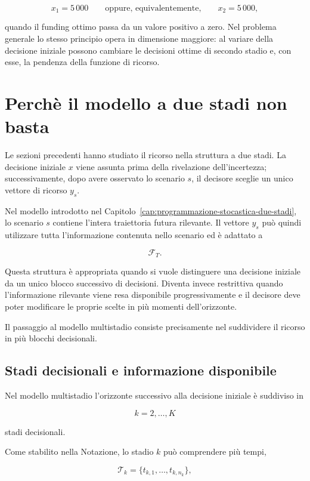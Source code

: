 \[
x_1=5\,000
\qquad\text{oppure, equivalentemente,}\qquad
x_2=5\,000,
\]

quando il funding ottimo passa da un valore positivo a zero. Nel problema
generale lo stesso principio opera in dimensione maggiore: al variare della
decisione iniziale possono cambiare le decisioni ottime di secondo stadio e,
con esse, la pendenza della funzione di ricorso.

\section{Perch\`e il modello a due stadi non basta}

\label{sec:cap15-motivazione-multistadio-v2}

Le sezioni precedenti hanno studiato il ricorso nella struttura a due stadi.
La decisione iniziale $x$ viene assunta prima della rivelazione
dell'incertezza; successivamente, dopo avere osservato lo scenario $s$, il
decisore sceglie un unico vettore di ricorso $y_s$.

Nel modello introdotto nel Capitolo~\ref{cap:programmazione-stocastica-due-stadi},
lo scenario $s$ contiene l'intera traiettoria futura rilevante. Il vettore
$y_s$ pu\`o quindi utilizzare tutta l'informazione contenuta nello scenario
ed \`e adattato a

\[
\mathcal F_T.
\]

Questa struttura \`e appropriata quando si vuole distinguere una decisione
iniziale da un unico blocco successivo di decisioni. Diventa invece
restrittiva quando l'informazione rilevante viene resa disponibile
progressivamente e il decisore deve poter modificare le proprie scelte in
pi\`u momenti dell'orizzonte.

Il passaggio al modello multistadio consiste precisamente nel suddividere il
ricorso in pi\`u blocchi decisionali.

\subsection{Stadi decisionali e informazione disponibile}

Nel modello multistadio l'orizzonte successivo alla decisione iniziale \`e
suddiviso in

\[
k=2,\ldots,K
\]

stadi decisionali.

Come stabilito nella Notazione, lo stadio $k$ pu\`o comprendere pi\`u tempi,

\[
\mathcal T_k
=
\{t_{k,1},\ldots,t_{k,n_k}\},
\]

